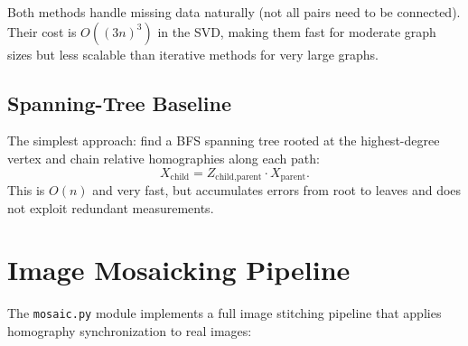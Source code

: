 \documentclass[11pt, a4paper]{article}
\begin{document}
Both methods handle missing data naturally (not all pairs need to be connected).
Their cost is $O((3n)^3)$ in the SVD, making them fast for moderate graph sizes
but less scalable than iterative methods for very large graphs.

\subsection{Spanning-Tree Baseline}

The simplest approach: find a BFS spanning tree rooted at the highest-degree
vertex and chain relative homographies along each path:
\begin{equation}
    X_{\text{child}} = Z_{\text{child},\text{parent}} \cdot X_{\text{parent}}.
\end{equation}
This is $O(n)$ and very fast, but accumulates errors from root to leaves and
does not exploit redundant measurements.

\section{Image Mosaicking Pipeline}
\label{sec:mosaic}

The \texttt{mosaic.py} module implements a full image stitching pipeline that
applies homography synchronization to real images:
\end{document}
